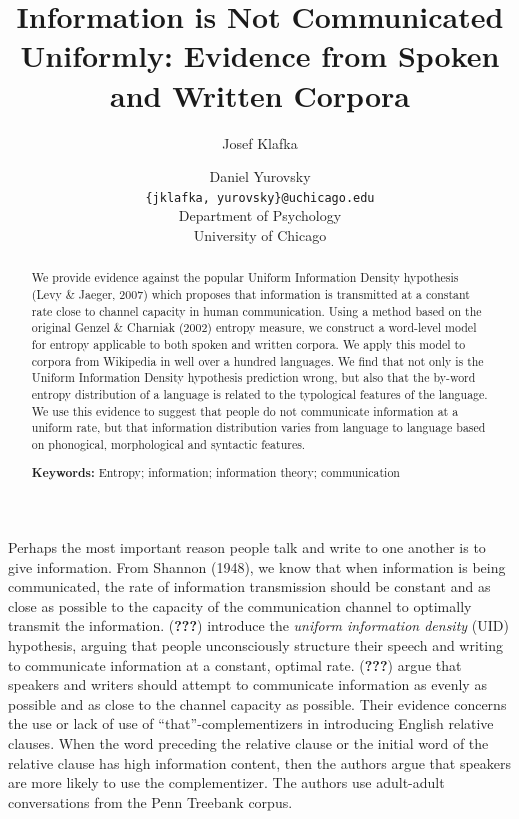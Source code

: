 \documentclass[10pt, letterpaper]{article}
\title{Information is Not Communicated Uniformly: Evidence from Spoken and
Written Corpora}
\author{Josef Klafka \and Daniel Yurovsky \\
        \texttt{\{jklafka, yurovsky\}@uchicago.edu} \\
       Department of Psychology \\ University of Chicago}
\begin{document}
\maketitle

\begin{abstract}
We provide evidence against the popular Uniform Information Density
hypothesis (Levy \& Jaeger, 2007) which proposes that information is
transmitted at a constant rate close to channel capacity in human
communication. Using a method based on the original Genzel \& Charniak
(2002) entropy measure, we construct a word-level model for entropy
applicable to both spoken and written corpora. We apply this model to
corpora from Wikipedia in well over a hundred languages. We find that
not only is the Uniform Information Density hypothesis prediction wrong,
but also that the by-word entropy distribution of a language is related
to the typological features of the language. We use this evidence to
suggest that people do not communicate information at a uniform rate,
but that information distribution varies from language to language based
on phonogical, morphological and syntactic features.

\textbf{Keywords:}
Entropy; information; information theory; communication
\end{abstract}

Perhaps the most important reason people talk and write to one another
is to give information. From Shannon (1948), we know that when
information is being communicated, the rate of information transmission
should be constant and as close as possible to the capacity of the
communication channel to optimally transmit the information.
({\textbf{???}}) introduce the \emph{uniform information density} (UID)
hypothesis, arguing that people unconsciously structure their speech and
writing to communicate information at a constant, optimal rate.
({\textbf{???}}) argue that speakers and writers should attempt to
communicate information as evenly as possible and as close to the
channel capacity as possible. Their evidence concerns the use or lack of
use of ``that''-complementizers in introducing English relative clauses.
When the word preceding the relative clause or the initial word of the
relative clause has high information content, then the authors argue
that speakers are more likely to use the complementizer. The authors use
adult-adult conversations from the Penn Treebank corpus.
\end{document}
